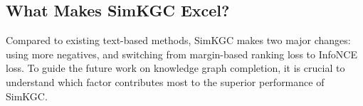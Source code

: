 \documentclass[11pt]{article}
\begin{document}
\subsection{What Makes SimKGC Excel?}

Compared to existing text-based methods,
SimKGC makes two major changes:
using more negatives,
and switching from margin-based ranking loss to InfoNCE loss.
To guide the future work on knowledge graph completion,
it is crucial to understand which factor contributes most
to the superior performance of SimKGC.

\begin{table}[ht]
\centering
{}
\caption{Analysis of loss function and the number of negatives on the WN18RR dataset.}
\label{tab:ablation_key_factor}
\end{table}
\end{document}
